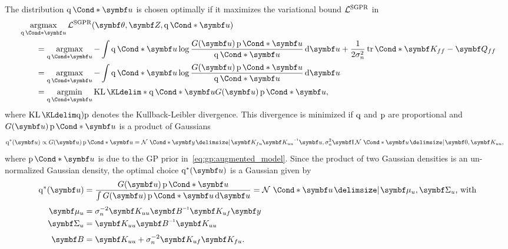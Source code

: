 The distribution $\Variat*{\mat{u}}$ is chosen optimally if it maximizes the variational bound $\mathcal{L}^{\text{SGPR}}$ in
\begin{align}
    \begin{split}
        \MoveEqLeft\argmax_{\Variat*{\mat{u}}}\Lc^{\text{SGPR}}(\mat{\theta}, \mat{Z}, \Variat*{\mat{u}})                                                                                             \\
        & = \argmax_{\Variat*{\mat{u}}} -\int \Variat*{\mat{u}} \log\frac{G(\mat{u})\Prob*{\mat{u}}}{\Variat*{\mat{u}}} \diff \mat{u} + \frac{1}{2\sigma_n^2}\Fun*{\tr}{\mat{K_{ff}} - \mat{Q_{ff}}} \\
        & = \argmax_{\Variat*{\mat{u}}} -\int \Variat*{\mat{u}} \log\frac{G(\mat{u})\Prob*{\mat{u}}}{\Variat*{\mat{u}}} \diff \mat{u}                                                                \\
        & = \argmin_{\Variat*{\mat{u}}} \KL*{\Variat*{\mat{u}}}{G(\mat{u})\Prob*{\mat{u}}},
    \end{split}
\end{align}
where $\KL{\q)}{\p}$ denotes the Kullback-Leibler divergence.
This divergence is minimized if $\operatorname{q}$ and $\operatorname{p}$ are proportional and $G(\mat{u})\Prob*{\mat{u}}$ is a product of Gaussians
\begin{align}
    \q^\ast(\mat{u}) \propto G(\mat{u}) \Prob*{\mat{u}}
     & = \Gaussian*{\mat{y} \given \mat{K_{fu}} \mat{K_{uu}}\inv \mat{u}, \sigma_n^2\Eye}\Gaussian*{\mat{u} \given \mat{0}, \mat{K_{uu}}},
\end{align}
where $\Prob*{\mat{u}}$ is due to the GP prior in~\cref{eq:gp:augmented_model}.
Since the product of two Gaussian densities is an un-normalized Gaussian density, the optimal choice $\q^\ast(\mat{u})$ is a Gaussian given by
\begin{align}
    \begin{split}
        \label{eq:gp:sgpr_optimal_q}
        \q^\ast(\mat{u})
        & = \frac{G(\mat{u}) \Prob*{\mat{u}}}{\int G(\mat{u}) \Prob*{\mat{u}} \diff \mat{u}}
        = \Gaussian*{\mat{u} \given \mat{\mu}_u, \mat{\Sigma}_u}\text{, with}                 \\[\smallskipamount]
        \mat{\mu}_u
        & = \sigma_n^{-2} \mat{K_{uu}}\mat{B}\inv \mat{K_{uf}}\mat{y}                        \\
        \mat{\Sigma}_u
        & = \mat{K_{uu}}\mat{B}\inv\mat{K_{uu}}                                              \\[\smallskipamount]
        \mat{B}
        & = \mat{K_{uu}} + \sigma_n^{-2} \mat{K_{uf}}\mat{K_{fu}}.
    \end{split}
\end{align}
